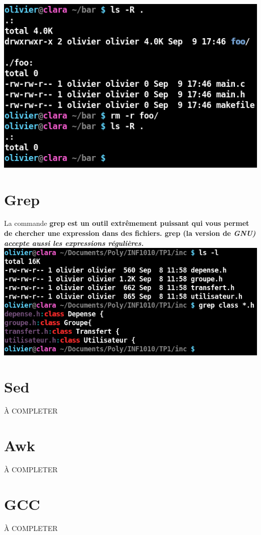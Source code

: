 \documentclass[12pt,oneside,final]{article}
\begin{document}
\includegraphics[scale=2]{bash_rm} \\


\newpage
\section{Grep}
La commande \bf{grep} est un outil extrêmement puissant qui vous
permet de chercher une expression dans des fichiers. \bf{grep} (la
version de \it{GNU}) accepte aussi les expressions régulières. \\

\includegraphics[scale=2]{grep} \\


\section{Sed}
À COMPLETER
\section{Awk}
À COMPLETER
\section{GCC}
À COMPLETER
\end{document}

